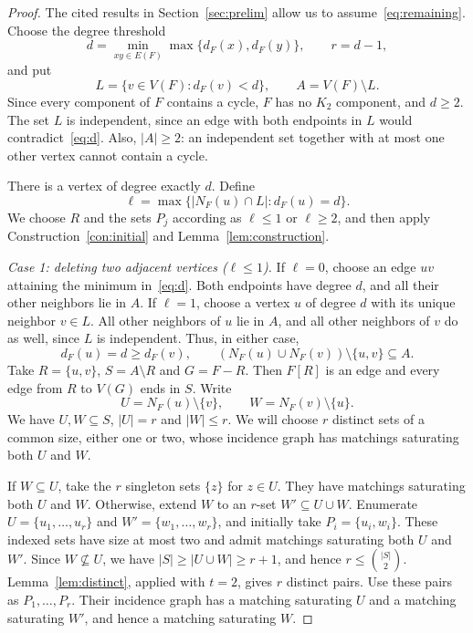 \documentclass[11pt,a4paper]{article}
\numberwithin{equation}{section}
\theoremstyle{definition}
\theoremstyle{plain}
\begin{document}
\begin{proof}
The cited results in Section~\ref{sec:prelim} allow us to
assume~\eqref{eq:remaining}. Choose the degree threshold
\begin{equation}\label{eq:d}
 d=\min_{xy\in E(F)}\max\{d_F(x),d_F(y)\},\qquad r=d-1,
\end{equation}
and put
\[
 L=\{v\in V(F):d_F(v)<d\},\qquad A=V(F)\setminus L.
\]
Since every component of $F$ contains a cycle, $F$ has no $K_2$
component, and $d\ge2$. The set $L$ is independent, since an edge
with both endpoints in $L$ would contradict~\eqref{eq:d}.
Also, $|A|\ge2$: an independent set together with at most one other
vertex cannot contain a cycle.

There is a vertex of degree exactly $d$. Define
\[
 \ell=\max\{|N_F(u)\cap L|:d_F(u)=d\}.
\]
We choose $R$ and the sets $P_j$ according as $\ell\le1$ or
$\ell\ge2$, and then apply Construction~\ref{con:initial} and
Lemma~\ref{lem:construction}.

\smallskip
\noindent\textit{Case 1: deleting two adjacent vertices ($\ell\le1$).}
If $\ell=0$, choose an edge $uv$ attaining the minimum in~\eqref{eq:d}.
Both endpoints have degree $d$, and all their other neighbors lie in
$A$. If $\ell=1$, choose a vertex $u$ of degree $d$ with its unique
neighbor $v\in L$. All other neighbors of $u$ lie in $A$, and all
other neighbors of $v$ do as well, since $L$ is independent.
Thus, in either case,
\[
 d_F(u)=d\ge d_F(v),\qquad
 (N_F(u)\cup N_F(v))\setminus\{u,v\}\subseteq A.
\]
Take $R=\{u,v\}$, $S=A\setminus R$ and $G=F-R$.
Then $F[R]$ is an edge and every edge from $R$ to $V(G)$ ends in $S$.
Write
\[
 U=N_F(u)\setminus\{v\},\qquad W=N_F(v)\setminus\{u\}.
\]
We have $U,W\subseteq S$, $|U|=r$ and $|W|\le r$.
We will choose $r$ distinct sets of a common size, either one or two,
whose incidence graph has matchings saturating both $U$ and $W$.

If $W\subseteq U$, take the $r$ singleton sets $\{z\}$ for $z\in U$.
They have matchings saturating both $U$ and $W$.
Otherwise, extend $W$ to an $r$-set $W'\subseteq U\cup W$.
Enumerate $U=\{u_1,\ldots,u_r\}$ and $W'=\{w_1,\ldots,w_r\}$,
and initially take $P_i=\{u_i,w_i\}$. These indexed sets have size at
most two and admit matchings saturating both $U$ and $W'$.
Since $W\nsubseteq U$, we have $|S|\ge |U\cup W|\ge r+1$, and hence
$r\le\binom{|S|}{2}$. Lemma~\ref{lem:distinct}, applied with $t=2$,
gives $r$ distinct pairs. Use these pairs as $P_1,\ldots,P_r$.
Their incidence graph has a matching saturating $U$ and a matching
saturating $W'$, and hence a matching saturating $W$.


\end{proof}
\end{document}
